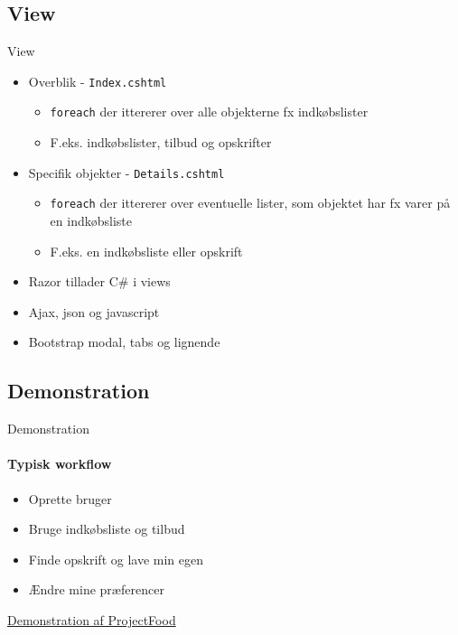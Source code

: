 \subsection{View}
\begin{frame}{View}
	\begin{itemize}
		\item Overblik - \texttt{Index.cshtml}
		\begin{itemize}
			\item \texttt{foreach} der ittererer over alle objekterne fx indkøbslister
			\item F.eks. indkøbslister, tilbud og opskrifter
		\end{itemize}
		\item Specifik objekter - \texttt{Details.cshtml}
		\begin{itemize}
			\item \texttt{foreach} der ittererer over eventuelle lister, som objektet har fx varer på en indkøbsliste
			\item F.eks. en indkøbsliste eller opskrift
		\end{itemize}
		\item Razor tillader C\# i views
		\item Ajax, json og javascript
		\item Bootstrap modal, tabs og lignende
	\end{itemize}
\end{frame}

\subsection{Demonstration}
\begin{frame}{Demonstration}
	\framesubtitle{Typisk workflow}
	\begin{itemize}
	\item Oprette bruger
	\item Bruge indkøbsliste og tilbud
	\item Finde opskrift og lave min egen
	\item Ændre mine præferencer
	\end{itemize}
	\href{http://james:8080}{Demonstration af ProjectFood}
\end{frame}